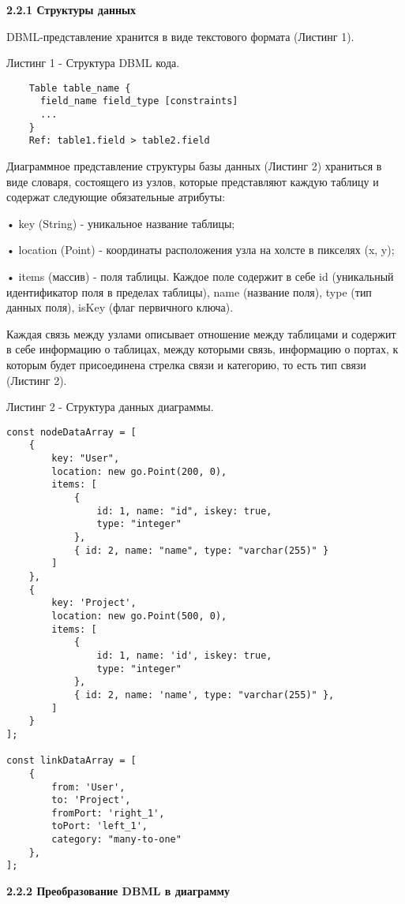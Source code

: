 \textbf{2.2.1 Структуры данных}

DBML-представление хранится в виде текстового формата (Листинг 1).

Листинг 1 - Структура DBML кода.
\begin{lstlisting}
    Table table_name {
      field_name field_type [constraints]
      ...
    }
    Ref: table1.field > table2.field
\end{lstlisting}

Диаграммное представление структуры базы данных (Листинг 2) храниться в виде словаря, состоящего из узлов, которые представляют каждую таблицу  и содержат следующие обязательные атрибуты:

• key (String) - уникальное название таблицы;

• location (Point) - координаты расположения узла на холсте в пикселях (x, y);

• items (массив) - поля таблицы. Каждое поле содержит в себе id (уникальный идентификатор поля в пределах таблицы), name (название поля), type (тип данных поля), isKey (флаг первичного ключа). 

Каждая связь между узлами описывает отношение между таблицами и содержит в себе информацию о таблицах, между которыми связь, информацию о портах, к которым будет присоединена стрелка связи и категорию, то есть тип связи (Листинг 2). 

Листинг 2 - Структура данных диаграммы.
\begin{lstlisting}[label=some-code]
const nodeDataArray = [
    {
        key: "User",
        location: new go.Point(200, 0),
        items: [
            {
                id: 1, name: "id", iskey: true,
                type: "integer"
            },
            { id: 2, name: "name", type: "varchar(255)" }
        ]
    },
    {
        key: 'Project',
        location: new go.Point(500, 0),
        items: [
            {
                id: 1, name: 'id', iskey: true,
                type: "integer"
            },
            { id: 2, name: 'name', type: "varchar(255)" },
        ]
    }
];

const linkDataArray = [
    {
        from: 'User',
        to: 'Project',
        fromPort: 'right_1',
        toPort: 'left_1',
        category: "many-to-one"
    },
];
\end{lstlisting}

\textbf{\large 2.2.2 Преобразование DBML в диаграмму}

